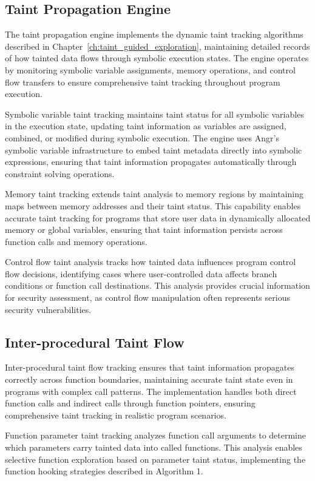 \subsection{Taint Propagation Engine}

The taint propagation engine implements the dynamic taint tracking algorithms described in Chapter~\ref{ch:taint_guided_exploration}, maintaining detailed records of how tainted data flows through symbolic execution states. The engine operates by monitoring symbolic variable assignments, memory operations, and control flow transfers to ensure comprehensive taint tracking throughout program execution.

Symbolic variable taint tracking maintains taint status for all symbolic variables in the execution state, updating taint information as variables are assigned, combined, or modified during symbolic execution. The engine uses Angr's symbolic variable infrastructure to embed taint metadata directly into symbolic expressions, ensuring that taint information propagates automatically through constraint solving operations.

Memory taint tracking extends taint analysis to memory regions by maintaining maps between memory addresses and their taint status. This capability enables accurate taint tracking for programs that store user data in dynamically allocated memory or global variables, ensuring that taint information persists across function calls and memory operations.

Control flow taint analysis tracks how tainted data influences program control flow decisions, identifying cases where user-controlled data affects branch conditions or function call destinations. This analysis provides crucial information for security assessment, as control flow manipulation often represents serious security vulnerabilities.

\subsection{Inter-procedural Taint Flow}

Inter-procedural taint flow tracking ensures that taint information propagates correctly across function boundaries, maintaining accurate taint state even in programs with complex call patterns. The implementation handles both direct function calls and indirect calls through function pointers, ensuring comprehensive taint tracking in realistic program scenarios.

Function parameter taint tracking analyzes function call arguments to determine which parameters carry tainted data into called functions. This analysis enables selective function exploration based on parameter taint status, implementing the function hooking strategies described in Algorithm 1.

